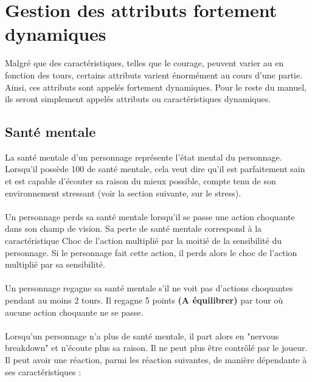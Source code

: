 \section{Gestion des attributs fortement dynamiques}
Malgré que des caractéristiques, telles que le courage, peuvent varier au en fonction des tours, certains attributs varient énormément au cours d'une partie. Ainsi, ces attributs sont appelés fortement dynamiques. Pour le reste du manuel, ils seront simplement appelés attributs ou caractéristiques dynamiques.
\subsection{Santé mentale}
La santé mentale d'un personnage représente l'état mental du personnage. Lorsqu'il possède 100 de santé mentale, cela veut dire qu'il est parfaitement sain et est capable d'écouter sa raison du mieux possible, compte tenu de son environnement stressant (voir la section suivante, sur le stress).
\\\\
Un personnage perds sa santé mentale lorsqu'il se passe une action choquante dans son champ de vision. Sa perte de santé mentale correspond à la caractéristique Choc de l'action multiplié par la moitié de la sensibilité du personnage. Si le personnage fait cette action, il perds alors le choc de l'action multiplié par sa sensibilité.
\\\\
Un personnage regagne sa santé mentale s'il ne voit pas d'actions choquantes pendant au moins 2 tours. Il regagne 5 points \textbf{(A équilibrer)} par tour où aucune action choquante ne se passe.
\\\\
Lorsqu'un personnage n'a plus de santé mentale, il part alors en "nervous breakdown" et n'écoute plus sa raison. Il ne peut plus être contrôlé par le joueur. Il peut avoir une réaction, parmi les réaction suivantes, de manière dépendante à ses caractéristiques :
